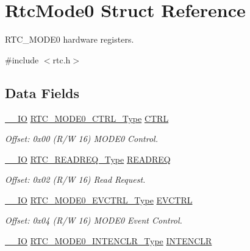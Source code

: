 \hypertarget{struct_rtc_mode0}{}\section{Rtc\+Mode0 Struct Reference}
\label{struct_rtc_mode0}


R\+T\+C\+\_\+\+M\+O\+D\+E0 hardware registers.  




{\ttfamily \#include $<$rtc.\+h$>$}

\subsection*{Data Fields}
\begin{DoxyCompactItemize}
\item 
\mbox{\hyperlink{core__cm0plus_8h_aec43007d9998a0a0e01faede4133d6be}{\+\_\+\+\_\+\+IO}} \mbox{\hyperlink{union_r_t_c___m_o_d_e0___c_t_r_l___type}{R\+T\+C\+\_\+\+M\+O\+D\+E0\+\_\+\+C\+T\+R\+L\+\_\+\+Type}} \mbox{\hyperlink{struct_rtc_mode0_a8bcd9282aa91de282d42bc3cbe47160b}{C\+T\+RL}}
\begin{DoxyCompactList}\small\item\em Offset\+: 0x00 (R/W 16) M\+O\+D\+E0 Control. \end{DoxyCompactList}\item 
\mbox{\hyperlink{core__cm0plus_8h_aec43007d9998a0a0e01faede4133d6be}{\+\_\+\+\_\+\+IO}} \mbox{\hyperlink{union_r_t_c___r_e_a_d_r_e_q___type}{R\+T\+C\+\_\+\+R\+E\+A\+D\+R\+E\+Q\+\_\+\+Type}} \mbox{\hyperlink{struct_rtc_mode0_aa1779f0fc09662a56db255c1637c56c0}{R\+E\+A\+D\+R\+EQ}}
\begin{DoxyCompactList}\small\item\em Offset\+: 0x02 (R/W 16) Read Request. \end{DoxyCompactList}\item 
\mbox{\hyperlink{core__cm0plus_8h_aec43007d9998a0a0e01faede4133d6be}{\+\_\+\+\_\+\+IO}} \mbox{\hyperlink{union_r_t_c___m_o_d_e0___e_v_c_t_r_l___type}{R\+T\+C\+\_\+\+M\+O\+D\+E0\+\_\+\+E\+V\+C\+T\+R\+L\+\_\+\+Type}} \mbox{\hyperlink{struct_rtc_mode0_adc4a1ceb5a68b2bf1778d6c2cb99adc7}{E\+V\+C\+T\+RL}}
\begin{DoxyCompactList}\small\item\em Offset\+: 0x04 (R/W 16) M\+O\+D\+E0 Event Control. \end{DoxyCompactList}\item 
\mbox{\hyperlink{core__cm0plus_8h_aec43007d9998a0a0e01faede4133d6be}{\+\_\+\+\_\+\+IO}} \mbox{\hyperlink{union_r_t_c___m_o_d_e0___i_n_t_e_n_c_l_r___type}{R\+T\+C\+\_\+\+M\+O\+D\+E0\+\_\+\+I\+N\+T\+E\+N\+C\+L\+R\+\_\+\+Type}} \mbox{\hyperlink{struct_rtc_mode0_a89da856a2232099114f86ede79482a42}{I\+N\+T\+E\+N\+C\+LR}}

\end{DoxyCompactItemize}
